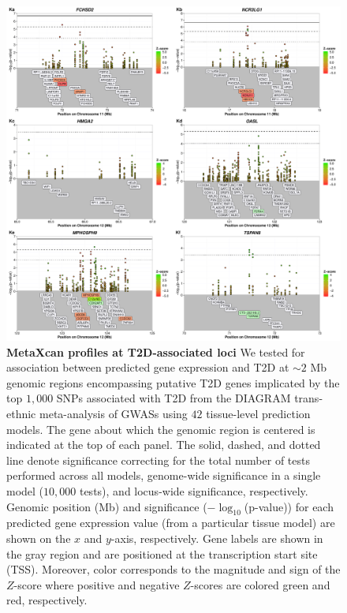 \documentclass[10pt]{article}
\begin{document}
\begin{figure}
\ContinuedFloat
\includegraphics[width=\textwidth]{sup_fig1_part11_locusArray.pdf}
	\caption{\textbf{MetaXcan profiles at T2D-associated loci} We tested for association between predicted gene expression and T2D at $\sim2$ Mb genomic regions encompassing putative T2D genes implicated by the top $1,000$ SNPs associated with T2D from the DIAGRAM trans-ethnic meta-analysis of GWASs using $42$ tissue-level prediction models. The gene about which the genomic region is centered is indicated at the top of each panel. The solid, dashed, and dotted line denote significance correcting for the total number of tests performed across all models, genome-wide significance in a single model ($10,000$ tests), and locus-wide significance, respectively. Genomic position (Mb) and significance ($-\log_{10}$(p-value)) for each predicted gene expression value (from a particular tissue model) are shown on the $x$ and $y$-axis, respectively. Gene labels are shown in the gray region and are positioned at the transcription start site (TSS). Moreover, color corresponds to the magnitude and sign of the $Z$-score where positive and negative $Z$-scores are colored green and red, respectively.} 
    \label{fig:supp.locus_array_fig1_part11}
\end{figure}
\end{document}
